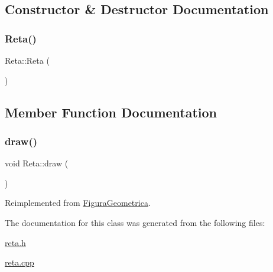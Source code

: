 \subsection{Constructor \& Destructor Documentation}
\mbox{\label{class_reta_ab4754dffc985acd6cf4eec6f9bac668a}} 
\subsubsection{\texorpdfstring{Reta()}{Reta()}}
{\footnotesize\ttfamily Reta\+::\+Reta (\begin{DoxyParamCaption}{ }\end{DoxyParamCaption})}



\subsection{Member Function Documentation}
\mbox{\label{class_reta_a1c370279480f421bf617e5fbfbbb63a1}} 
\subsubsection{\texorpdfstring{draw()}{draw()}}
{\footnotesize\ttfamily void Reta\+::draw (\begin{DoxyParamCaption}{ }\end{DoxyParamCaption})\hspace{0.3cm}{\ttfamily [virtual]}}



Reimplemented from \hyperlink{class_figura_geometrica_a417090ea2019fc1d58cdb345167aebea}{Figura\+Geometrica}.



The documentation for this class was generated from the following files\+:\begin{DoxyCompactItemize}
\item 
\hyperlink{reta_8h}{reta.\+h}\item 
\hyperlink{reta_8cpp}{reta.\+cpp}\end{DoxyCompactItemize}
